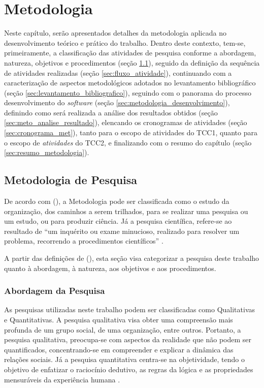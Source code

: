 \chapter[Metodologia]{Metodologia}

\label{chap:metodologia}

Neste capítulo, serão apresentados detalhes da metodologia aplicada no desenvolvimento teórico e prático do trabalho. Dentro deste contexto, tem-se, primeiramente, a classificação das atividades de pesquisa conforme a abordagem, natureza, objetivos e procedimentos (seção \ref{sec:met_pesquisa}), seguido da definição da sequência de atividades realizadas (seção \ref{sec:fluxo_atividade}), continuando com a caracterização de aspectos metodológicos adotados no levantamento bibliográfico (seção \ref{sec:levantamento_bibliografico}), seguindo com o panorama do processo desenvolvimento do \textit{software} (seção \ref{sec:metodologia_desenvolvimento}), definindo como será realizada a análise dos resultados obtidos (seção \ref{sec:meto_analise_resultado}), elencando os cronogramas de atividades (seção \ref{sec:cronograma_met}), tanto para o escopo de atividades do TCC1, quanto para o escopo de \textit{atividades} do TCC2, e finalizando com o resumo do capítulo (seção \ref{sec:resumo_metodologia}).

\section{Metodologia de Pesquisa}
\label{sec:met_pesquisa}
De acordo com  (\citeyear{gerhardt2009metodos}), a Metodologia pode ser classificada como o estudo da organização, dos caminhos a serem trilhados, para se realizar uma pesquisa ou um estudo, ou para produzir ciência. Já a pesquisa científica, refere-se ao resultado de “um inquérito ou exame minucioso, realizado para resolver um problema, recorrendo a procedimentos científicos” \cite{gerhardt2009metodos}.

A partir das definições de  (\citeyear{gerhardt2009metodos}), esta seção visa categorizar a pesquisa deste trabalho quanto à abordagem, à natureza, aos objetivos e aos procedimentos.

\subsection{Abordagem da Pesquisa}

As pesquisas utilizadas neste trabalho podem ser classificadas como Qualitativas e Quantitativas. A pesquisa qualitativa visa obter uma compreensão mais profunda de um grupo social, de uma organização, entre outros. Portanto, a pesquisa qualitativa, preocupa-se com aspectos da realidade que não podem ser quantificados, concentrando-se em compreender e explicar a dinâmica das relações sociais. Já a pesquisa quantitativa centra-se na objetividade, tendo o objetivo de enfatizar o raciocínio dedutivo, as regras da lógica e as propriedades mensuráveis da experiência humana \cite{gerhardt2009metodos}.

